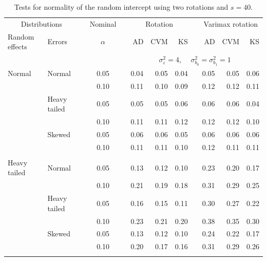 \documentclass[12pt]{article} %
\begin{document}
\begin{table}[ht]
\caption{Tests for normality of the random intercept using two rotations and $s = 40$.}
\begin{scriptsize}
\begin{center}
\begin{tabular}{ll p{.1cm} c p{.1cm} rrr p{.1cm} rrr}
  \hline
  \multicolumn{2}{c}{Distributions}& & Nominal & &  \multicolumn{3}{c}{Rotation} & & \multicolumn{3}{c}{Varimax rotation} \\ \cline{1-2} \cline{6-8} \cline{10-12}   
  Random effects & Errors & & $\alpha$ & & AD & CVM & KS & & AD & CVM & KS \\ 
   \hline
& && && \multicolumn{7}{c}{$\sigma_{\varepsilon}^2 = 4$, \ \ $\sigma_{b_0}^2 = \sigma_{b_1}^2 = 1$} \\ \cline{6-12}
\rowcolor{gray!20}Normal       & Normal       && 0.05 &&   0.04 & 0.05 & 0.04 && 0.05 & 0.05 & 0.06 \\ 
\rowcolor{gray!20}             &              && 0.10 &&   0.11 & 0.10 & 0.09 && 0.12 & 0.12 & 0.11 \\ 
\rowcolor{gray!20}             & Heavy tailed && 0.05 &&   0.05 & 0.05 & 0.06 && 0.06 & 0.06 & 0.04 \\ 
\rowcolor{gray!20}             &              && 0.10 &&   0.11 & 0.11 & 0.12 && 0.12 & 0.12 & 0.10 \\ 
\rowcolor{gray!20}             & Skewed       && 0.05 &&   0.06 & 0.06 & 0.05 && 0.06 & 0.06 & 0.06 \\ 
\rowcolor{gray!20}             &              && 0.10 &&   0.11 & 0.11 & 0.10 && 0.12 & 0.11 & 0.11 \\ 
             &&&&&&&&&&&\\
Heavy tailed & Normal       && 0.05 &&   0.13 & 0.12 & 0.10 && 0.23 & 0.20 & 0.17 \\ 
             &              && 0.10 &&   0.21 & 0.19 & 0.18 && 0.31 & 0.29 & 0.25 \\ 
             & Heavy tailed && 0.05 &&   0.16 & 0.15 & 0.11 && 0.30 & 0.27 & 0.22 \\ 
             &              && 0.10 &&   0.23 & 0.21 & 0.20 && 0.38 & 0.35 & 0.30 \\ 
             & Skewed       && 0.05 &&   0.13 & 0.12 & 0.10 && 0.24 & 0.22 & 0.17 \\ 
             &              && 0.10 &&   0.20 & 0.17 & 0.16 && 0.31 & 0.29 & 0.26 \\ 
             &&&&&&&&&&&\\

\end{tabular}
\end{center}
\end{scriptsize}
\end{table}
\end{document}

